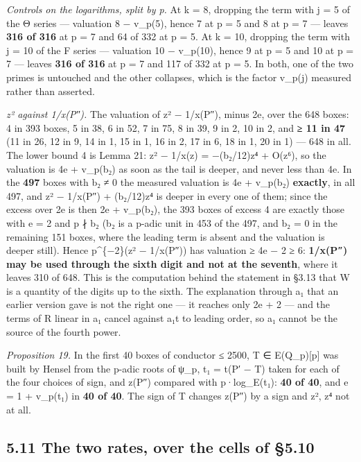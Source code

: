\documentclass[11pt,a4paper]{article}
\theoremstyle{named}
\begin{document}
\textit{Controls on the logarithms, split by p.} At k = 8, dropping the term with j = 5 of the Θ series — valuation 8 − v\_p(5), hence 7 at p = 5 and 8 at p = 7 — leaves \textbf{316 of 316} at p = 7 and 64 of 332 at p = 5. At k = 10, dropping the term with j = 10 of the F series — valuation 10 − v\_p(10), hence 9 at p = 5 and 10 at p = 7 — leaves \textbf{316 of 316} at p = 7 and 117 of 332 at p = 5. In both, one of the two primes is untouched and the other collapses, which is the factor v\_p(j) measured rather than asserted.

\textit{z² against 1/x(P″).} The valuation of z² − 1/x(P″), minus 2e, over the 648 boxes: 4 in 393 boxes, 5 in 38, 6 in 52, 7 in 75, 8 in 39, 9 in 2, 10 in 2, and \textbf{≥ 11 in 47} (11 in 26, 12 in 9, 14 in 1, 15 in 1, 16 in 2, 17 in 6, 18 in 1, 20 in 1) — 648 in all. The lower bound 4 is Lemma 21: z² − 1/x(z) = −(b₂/12)z⁴ + O(z⁶), so the valuation is 4e + v\_p(b₂) as soon as the tail is deeper, and never less than 4e. In the \textbf{497} boxes with b₂ ≠ 0 the measured valuation is 4e + v\_p(b₂) \textbf{exactly}, in all 497, and z² − 1/x(P″) + (b₂/12)z⁴ is deeper in every one of them; since the excess over 2e is then 2e + v\_p(b₂), the 393 boxes of excess 4 are exactly those with e = 2 and p ∤ b₂ (b₂ is a p-adic unit in 453 of the 497, and b₂ = 0 in the remaining 151 boxes, where the leading term is absent and the valuation is deeper still). Hence p\textasciicircum{}\{−2\}(z² − 1/x(P″)) has valuation ≥ 4e − 2 ≥ 6: \textbf{1/x(P″) may be used through the sixth digit and not at the seventh}, where it leaves 310 of 648. This is the computation behind the statement in §3.13 that W is a quantity of the digits up to the sixth. The explanation through a₁ that an earlier version gave is not the right one — it reaches only 2e + 2 — and the terms of R linear in a₁ cancel against a₁t to leading order, so a₁ cannot be the source of the fourth power.

\textit{Proposition 19.} In the first 40 boxes of conductor ≤ 2500, T ∈ E(Q\_p)[p] was built by Hensel from the p-adic roots of ψ\_p, t₁ = t(P′ − T) taken for each of the four choices of sign, and z(P″) compared with p·log\_E(t₁): \textbf{40 of 40}, and e = 1 + v\_p(t₁) in \textbf{40 of 40}. The sign of T changes z(P″) by a sign and z², z⁴ not at all.

\subsection*{5.11 The two rates, over the cells of §5.10}
\end{document}
